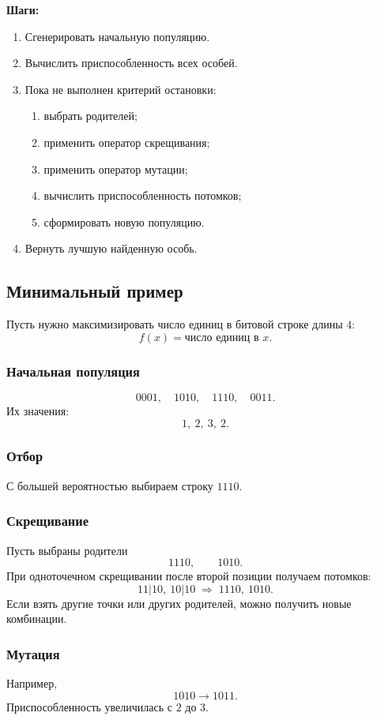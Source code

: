 \documentclass[12pt,a4paper]{article}
\theoremstyle{definition}
\theoremstyle{plain}
\begin{document}
\textbf{Шаги:}
\begin{enumerate}
\item Сгенерировать начальную популяцию.
\item Вычислить приспособленность всех особей.
\item Пока не выполнен критерий остановки:
\begin{enumerate}
\item выбрать родителей;
\item применить оператор скрещивания;
\item применить оператор мутации;
\item вычислить приспособленность потомков;
\item сформировать новую популяцию.
\end{enumerate}
\item Вернуть лучшую найденную особь.
\end{enumerate}

\subsection{Минимальный пример}
Пусть нужно максимизировать число единиц в битовой строке длины $4$:
\[
f(x)=\text{число единиц в }x.
\]

\subsubsection*{Начальная популяция}
\[
0001,\quad 1010,\quad 1110,\quad 0011.
\]
Их значения:
\[
1,\ 2,\ 3,\ 2.
\]

\subsubsection*{Отбор}
С большей вероятностью выбираем строку $1110$.

\subsubsection*{Скрещивание}
Пусть выбраны родители
\[
1110,\qquad 1010.
\]
При одноточечном скрещивании после второй позиции получаем потомков:
\[
11|10,\ 10|10 \;\Longrightarrow\; 1110,\ 1010.
\]
Если взять другие точки или других родителей, можно получить новые комбинации.

\subsubsection*{Мутация}
Например,
\[
1010\to 1011.
\]
Приспособленность увеличилась с $2$ до $3$.
\end{document}
